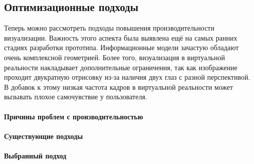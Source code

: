﻿\subsection{Оптимизационные подходы}

Теперь можно рассмотреть подходы повышения производительности визуализации.
Важность этого аспекта была выявлена 
ещё на самых ранних стадиях разработки прототипа.
Информационные модели зачастую обладают очень комплексной геометрией.
Более того, визуализация в виртуальной реальности накладывает
дополнительные ограничения, так как изображение проходит двукратную отрисовку
из-за наличия двух глаз с разной перспективой.
В добавок к этому низкая частота кадров в виртуальной реальности
может вызывать плохое самочувствие у пользователя.
\cite{Weech2019}

\paragraph{Причины проблем с производительностью}


\paragraph{Существующие подходы}


\paragraph{Выбранный подход}


